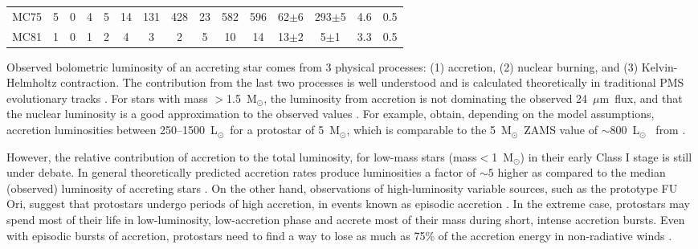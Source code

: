 \documentclass[iop]{emulateapj}
\newcommand{\msun}{M$_{\odot}$}
\newcommand{\lsun}{L$_{\odot}$}
\newcommand{\mipslam}{24~$\mu$m}
\begin{document}
\begin{table*}[!h!t]
\begin{center}
\begin{tabular}{ccccccccccccccc}
 MC75 & 5 & 0     & 4     & 5     & 14    &  131  &  428   & 23     & 582    & 596  & 62$\pm$6    & 293$\pm$5 & 4.6  & 0.5  \\
 MC81 & 1 & 0     & 1      & 2    & 4       &  3      &  2       & 5       & 10      & 14   & 13$\pm$2    & 5$\pm$1      & 3.3  & 0.5  \\
\hline
 \end{tabular}
\end{center}
 \end{table*}


Observed bolometric luminosity of an accreting star comes from 3 physical
processes: (1) accretion, (2) nuclear burning, and (3) Kelvin-Helmholtz 
contraction. The contribution from the last two processes is well understood 
and is calculated theoretically in traditional PMS evolutionary tracks 
\citep{palla+stahler93,tognelli+11}. 
For stars with mass $>$1.5~\msun, the luminosity from accretion is not
dominating the observed \mipslam ~flux, and that the nuclear luminosity 
is a good approximation to the observed values \citep{hillenbrand+white04}.
For example, \citet{myers14} obtain, depending on the model 
assumptions, accretion luminosities between 250--1500~\lsun\ for a 
protostar of 5~\msun, which 
is comparable to the 5~\msun~ZAMS value of $\sim$800~\lsun~ 
from \citet{tognelli+11}.
 
However, the relative contribution of accretion to the total luminosity, 
for low-mass stars (mass$<$1~\msun) in their
early Class I stage is still under debate. In general theoretically predicted
accretion rates produce luminosities a factor of $\sim5$ higher as compared
to the median (observed) luminosity of accreting stars 
\citep{kenyon+90,enoch+09}. On the other hand, observations of 
high-luminosity variable sources, such as the prototype FU Ori, suggest 
that protostars undergo periods of high accretion, in events known as 
episodic accretion \citep[e. g.][]{hartmann+kenyon96, vorobyov+basu05}.
In the extreme case, protostars may spend most of their life in low-luminosity,
low-accretion phase and accrete most of their mass during short, intense 
accretion bursts. Even with episodic bursts of accretion, protostars need
to find a way to lose as much as 75\% of the accretion energy in non-radiative 
winds \citep{offner+11}.
\end{document}
